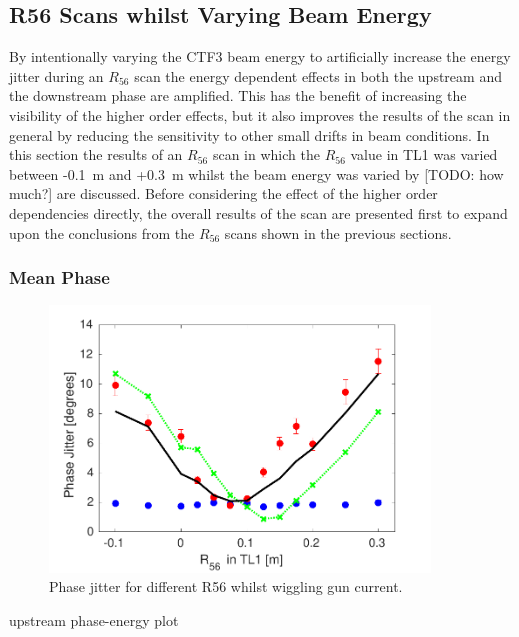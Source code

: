 \subsection{R56 Scans whilst Varying Beam Energy}
\label{ss:r56ScanWithEnergy}

By intentionally varying the CTF3 beam energy to artificially increase the energy jitter during an \(R_{56}\) scan the energy dependent effects in both the upstream and the downstream phase are amplified. This has the benefit of increasing the visibility of the higher order effects, but it also improves the results of the scan in general by reducing the sensitivity to other small drifts in beam conditions. In this section the results of an \(R_{56}\) scan in which the \(R_{56}\) value in TL1 was varied between -0.1~m and +0.3~m whilst the beam energy was varied by [TODO: how much?] are discussed. Before considering the effect of the higher order dependencies directly, the overall results of the scan are presented first to expand upon the conclusions from the \(R_{56}\) scans shown in the previous sections.

\subsubsection{Mean Phase}



\begin{figure}
  \centering
  \includegraphics[width=0.9\textwidth]{Figures/propagation/R56ScanGunWiggle_PhaseJitter}
  \caption{Phase jitter for different R56 whilst wiggling gun current.}
  \label{f:R56ScanGunWiggle_PhaseJitter}
\end{figure}


upstream phase-energy plot

